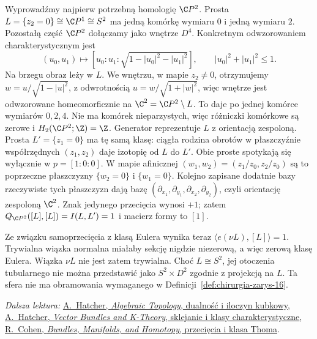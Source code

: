 \begin{przyklad}
\label{prz:cp2-forma-21}
Wyprowadźmy najpierw potrzebną homologię $\C P^2$.
Prosta $L=\{z_2=0\}\cong\C P^1\cong S^2$
ma jedną komórkę wymiaru $0$ i jedną wymiaru $2$.
Pozostałą część $\C P^2$ dołączamy jako wnętrze $D^4$.
Konkretnym odwzorowaniem charakterystycznym jest
\[
 (u_0,u_1)\longmapsto
 [u_0:u_1:\sqrt{1-|u_0|^2-|u_1|^2}],
 \qquad |u_0|^2+|u_1|^2\leq1.
\]
Na brzegu obraz leży w $L$. We wnętrzu, w mapie $z_2\ne0$,
otrzymujemy $w=u/\sqrt{1-|u|^2}$, z odwrotnością
$u=w/\sqrt{1+|w|^2}$, więc wnętrze jest odwzorowane
homeomorficznie na $\C^2=\C P^2\setminus L$.
To daje po jednej komórce wymiarów $0,2,4$.
Nie ma komórek nieparzystych,
więc różniczki komórkowe są zerowe i $H_2(\C P^2;\Z)=\Z$.
Generator reprezentuje $L$ z orientacją zespoloną.
Prosta $L'=\{z_1=0\}$ ma tę samą klasę:
ciągła rodzina obrotów w płaszczyźnie współrzędnych
$(z_1,z_2)$ daje izotopię od $L$ do $L'$.
Obie proste spotykają się wyłącznie w $p=[1:0:0]$.
W mapie afinicznej $(w_1,w_2)=(z_1/z_0,z_2/z_0)$
są to poprzeczne płaszczyzny $\{w_2=0\}$ i $\{w_1=0\}$.
Kolejno zapisane dodatnie bazy rzeczywiste tych
płaszczyzn dają bazę
$(\partial_{x_1},\partial_{y_1},\partial_{x_2},\partial_{y_2})$,
czyli orientację zespoloną $\C^2$.
Znak jedynego przecięcia wynosi $+1$; zatem
$Q_{\C P^2}([L],[L])=I(L,L')=1$ i macierz formy to $[1]$.

Ze związku samoprzecięcia z klasą Eulera wynika teraz
$\langle e(\nu L),[L]\rangle=1$.
Trywialna wiązka normalna miałaby sekcję nigdzie niezerową,
a więc zerową klasę Eulera. Wiązka $\nu L$ nie jest zatem
trywialna. Choć $L\cong S^2$, jej otoczenia tubularnego
nie można przedstawić jako $S^2\times D^2$ zgodnie
z projekcją na $L$. Ta sfera nie ma obramowania
wymaganego w Definicji~\ref{def:chirurgia-zarys-16}.
\end{przyklad}

\par\smallskip
{\footnotesize\noindent\emph{Dalsza lektura:}
\href{https://pi.math.cornell.edu/~hatcher/AT/AT.pdf}{A.\ Hatcher, \emph{Algebraic Topology}, dualność i iloczyn kubkowy},
\href{https://pi.math.cornell.edu/~hatcher/VBKT/VB.pdf}{A.\ Hatcher, \emph{Vector Bundles and K-Theory}, sklejanie i klasy charakterystyczne},
\href{https://math.stanford.edu/~ralph/bookR4.pdf}{R.\ Cohen, \emph{Bundles, Manifolds, and Homotopy}, przecięcia i klasa Thoma}.\par}
